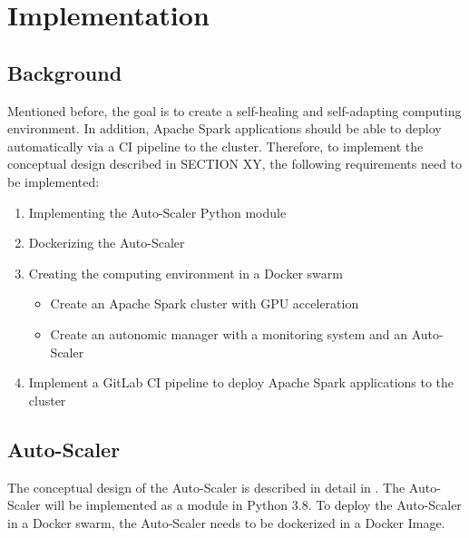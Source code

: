 \chapter{Implementation}
\label{chap:06_implementation}


\section{Background}
Mentioned before, the goal is to create a self-healing and self-adapting computing environment. In addition, Apache Spark applications  should be able to deploy automatically via a CI pipeline to the cluster. Therefore, to implement the conceptual design described in SECTION XY, the following requirements need to be implemented:

\begin{enumerate}
\item Implementing the Auto-Scaler Python module
\item Dockerizing the Auto-Scaler
\item Creating the computing environment in a Docker swarm
\begin{itemize}
\item Create an Apache Spark cluster with GPU acceleration
\item Create an autonomic manager with a monitoring system and an Auto-Scaler
\end{itemize}
\item Implement a GitLab CI pipeline to deploy Apache Spark applications to the cluster
\end{enumerate}


\section{Auto-Scaler}
The conceptual design of the Auto-Scaler is described in detail in . 
The Auto-Scaler will be implemented as a module in Python 3.8.
To deploy the Auto-Scaler in a Docker swarm, the Auto-Scaler needs to be dockerized in a Docker Image.

